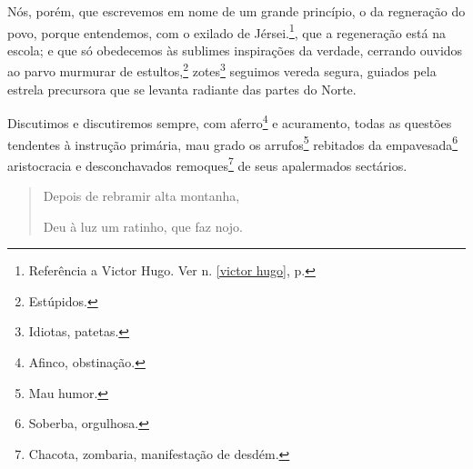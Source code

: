 Nós, porém, que escrevemos em nome de um grande princípio, o da
regneração do povo, porque entendemos, com o exilado de
Jérsei.\footnote{Referência a Victor Hugo. Ver n. \ref{victor hugo}, 
p. \pageref{victor hugo}}, que a regeneração está na escola; e que só 
obedecemos às sublimes inspirações da verdade, cerrando ouvidos ao 
parvo murmurar de estultos,\footnote{Estúpidos.} zotes\footnote{Idiotas, 
patetas.} seguimos vereda segura, guiados pela estrela precursora que 
se levanta radiante das partes do Norte.

Discutimos e discutiremos sempre, com aferro\footnote{Afinco,
  obstinação.} e acuramento, todas as questões tendentes à instrução
primária, mau grado os arrufos\footnote{Mau humor.} rebitados da
empavesada\footnote{Soberba, orgulhosa.} aristocracia e desconchavados
remoques\footnote{Chacota, zombaria, manifestação de desdém.} de seus
apalermados sectários.

\begin{quote}
Depois de rebramir alta montanha,

Deu à luz um ratinho, que faz nojo.
\end{quote}

